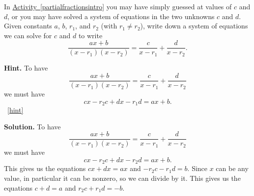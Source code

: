\documentclass{book}
\begin{document}
\setcounter{project}{265}
\addtocounter{project}{-1}
\begin{activity}[]\label{partialfractions1}
\hypertarget{p-1387}{}%
In \hyperref[partialfractionsintro]{Activity~\ref{partialfractionsintro}} you may have simply guessed at values of \(c\) and \(d\), or you may have solved a system of equations in the two unknowns \(c\) and \(d\). Given constants \(a\), \(b\), \(r_1\), and \(r_2\) (with \(r_1\not= r_2\)), write down a system of equations we can solve for \(c\) and \(d\) to write%
\begin{equation*}
\frac{ax+b}{(x-r_1)(x-r_2)} = \frac{c}{x-r_1} + \frac{d}{x-r_2}\text{.}
\end{equation*}
%
\par\smallskip%
\noindent\textbf{Hint.}\hypertarget{hint-170}{}\quad%
\hypertarget{p-1388}{}%
To have%
\begin{equation*}
\frac{ax+b}{(x-r_1)(x-r_2)} = \frac{c}{x-r_1} + \frac{d}{x-r_2}
\end{equation*}
we must have%
\begin{equation*}
cx-r_2c+dx-r_1d =ax+b\text{.}
\end{equation*}
%
~\hfill{\tiny\hyperlink{a-265}{[hint]}\hypertarget{q-265}{}}\par\smallskip%
\noindent\textbf{Solution.}\hypertarget{solution-177}{}\quad%
\hypertarget{p-1389}{}%
To have%
\begin{equation*}
\frac{ax+b}{(x-r_1)(x-r_2)} =  \frac{c}{x-r_1} + \frac{d}{x-r_2}
\end{equation*}
we must have%
\begin{equation*}
cx-r_2c+dx-r_2d = ax+b.
\end{equation*}
This gives us the equations \(cx+dx=ax\) and \(-r_2c-r_1d=b\). Since \(x\) can be any value, in particular it can be nonzero, so we can divide by it. This gives us the equations \(c+d=a\) and \(r_2c+r_1d=-b\).%
\end{activity}
\end{document}
